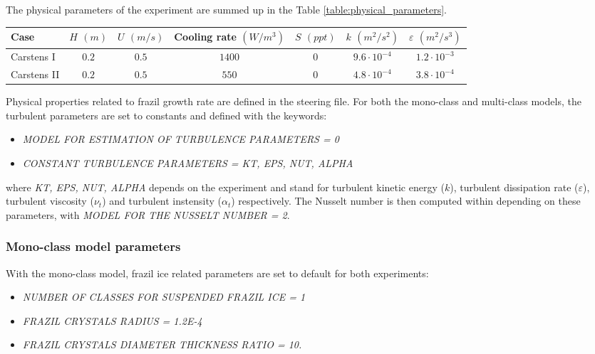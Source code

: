 The physical parameters of the experiment are summed up in the Table \ref{table:physical_parameters}.
\begin{center}
\begin{tabular}{lcccccc}
\hline
Case & $H$ $(m)$ & $U$ $(m/s)$ & Cooling rate $(W/m^3)$ & $S$ $(ppt)$ & $k$ $(m^2/s^2)$ & $\varepsilon$ $(m^2/s^3)$ \\
\hline \hline
Carstens I & $0.2$ & $0.5$ & $1400$ & $0$ & $9.6 \cdot 10^{-4}$ & $1.2 \cdot 10^{-3}$ \\
\hline
Carstens II & $0.2$ & $0.5$ & $550$ & $0$ & $4.8 \cdot 10^{-4}$ & $3.8 \cdot 10^{-4}$ \\
\hline
\end{tabular}
\label{table:physical_parameters}
\end{center}

Physical properties related to frazil growth rate are defined in the \khione steering file. 
For both the mono-class and multi-class models, the turbulent parameters are set to constants
and defined with the keywords:
\begin{itemize}
	\item\textit{MODEL FOR ESTIMATION OF TURBULENCE PARAMETERS = 0}
	\item\textit{CONSTANT TURBULENCE PARAMETERS = KT, EPS, NUT, ALPHA}
\end{itemize}
where \textit{KT, EPS, NUT, ALPHA} depends on the experiment and
stand for turbulent kinetic energy ($k$),
turbulent dissipation rate ($\varepsilon$), turbulent viscosity ($\nu_t$) and 
turbulent instensity ($\alpha_t$) respectively.
The Nusselt number is then computed within \khione depending on these parameters, 
with \textit{MODEL FOR THE NUSSELT NUMBER = 2}.

\subsubsection{Mono-class model parameters}
With the mono-class model, frazil ice related parameters are set to default 
for both experiments:
\begin{itemize}
	\item\textit{NUMBER OF CLASSES FOR SUSPENDED FRAZIL ICE = 1}
	\item\textit{FRAZIL CRYSTALS RADIUS = 1.2E-4}
	\item\textit{FRAZIL CRYSTALS DIAMETER THICKNESS RATIO = 10.}
\end{itemize}

